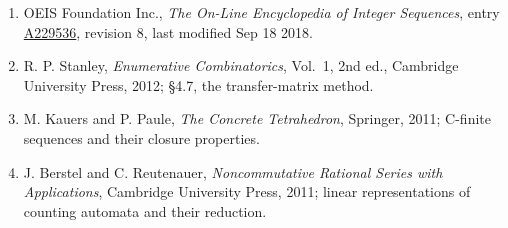 \documentclass[11pt]{article}
\theoremstyle{definition}
\begin{document}
\begin{enumerate}

\item OEIS Foundation Inc., \emph{The On-Line Encyclopedia of Integer Sequences}, entry \href{https://oeis.org/A229536}{A229536}, revision 8, last modified Sep 18 2018.

\item R. P. Stanley, \emph{Enumerative Combinatorics}, Vol.~1, 2nd ed., Cambridge University Press, 2012; \S4.7, the transfer-matrix method.

\item M. Kauers and P. Paule, \emph{The Concrete Tetrahedron}, Springer, 2011; C-finite sequences and their closure properties.

\item J. Berstel and C. Reutenauer, \emph{Noncommutative Rational Series with Applications}, Cambridge University Press, 2011; linear representations of counting automata and their reduction.

\end{enumerate}
\end{document}
